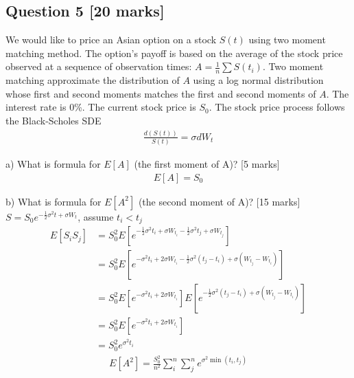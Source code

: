 \documentclass[11pt,a4paper,hidelinks,fleqn]{article}            %
\begin{document}
\subsection*{Question 5 [20 marks]}
We would like to price an Asian option on a stock $S(t)$ using two moment matching method.
The option's payoff is based on the average of the stock price observed at a sequence of observation times: $A = \frac{1}{n}\sum S(t_i)$.
Two moment matching approximate the distribution of $A$ using a log normal distribution whose first and second moments matches the first and second moments of $A$.
The interest rate is 0\%. The current stock price is $S_0$.
The stock price process follows the Black-Scholes SDE
\begin{align*}
\frac{d(S(t))}{S(t)} = \sigma dW_t
\end{align*}

a) What is formula for $E[A]$ (the first moment of A)? [5 marks]
\begin{align*}
E[A] = S_0
\end{align*}

b) What is formula for $E[A^2]$ (the second moment of A)? [15 marks]
$S = S_0 e^{-\frac12 \sigma^2 t + \sigma W_t}$, assume $t_i < t_j$
\begin{align*}
E[S_i S_j] & = S_0^2 E[e^{-\frac12 \sigma^2 {t_i} + \sigma W_{t_i} -\frac12 \sigma^2 {t_j} + \sigma W_{t_j}}] \\
		& = S_0^2 E[e^{-\sigma^2 {t_i} + 2\sigma W_{t_i} -\frac12 \sigma^2 (t_j-t_i) + \sigma (W_{t_j} - W_{t_i})}] \\
		& = S_0^2 E[e^{-\sigma^2 {t_i} + 2\sigma W_{t_i}}] E[e^{-\frac12 \sigma^2 (t_j-t_i) + \sigma (W_{t_j} - W_{t_i})}] \\
		& = S_0^2 E[e^{-\sigma^2 {t_i} + 2\sigma W_{t_i}}] \\
		& = S_0^2 e^{\sigma^2 t_i}
\end{align*}
\begin{align*}
E[A^2] =  \frac{S_0^2}{n^2} \sum_i^n \sum_j^n e^{\sigma^2 \min(t_i, t_j)}
\end{align*}
\end{document}
